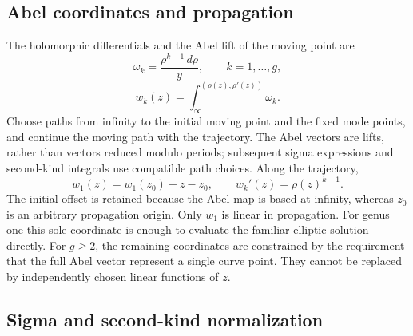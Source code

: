 \documentclass[11pt]{article}
\begin{document}
\subsection{Abel coordinates and propagation}

The holomorphic differentials and the Abel lift of the moving point are
\begin{equation}\label{eq:holomorphic-diffs}
\omega_k=\frac{\rho^{k-1}\,d\rho}{y},\qquad k=1,\ldots,g,
\end{equation}
\begin{equation}\label{eq:abel-map}
w_k(z)=\int_\infty^{(\rho(z),\rho'(z))}\omega_k.
\end{equation}
Choose paths from infinity to the initial moving point and the fixed mode points, and continue the moving path with the trajectory. The Abel vectors are lifts, rather than vectors reduced modulo periods; subsequent sigma expressions and second-kind integrals use compatible path choices. Along the trajectory,
\begin{equation}\label{eq:w-derivatives}
w_1(z)=w_1(z_0)+z-z_0,\qquad w_k'(z)=\rho(z)^{k-1}.
\end{equation}
The initial offset is retained because the Abel map is based at infinity, whereas $z_0$ is an arbitrary propagation origin. Only $w_1$ is linear in propagation. For genus one this sole coordinate is enough to evaluate the familiar elliptic solution directly. For $g\ge2$, the remaining coordinates are constrained by the requirement that the full Abel vector represent a single curve point. They cannot be replaced by independently chosen linear functions of $z$.

\subsection{Sigma and second-kind normalization}
\end{document}
